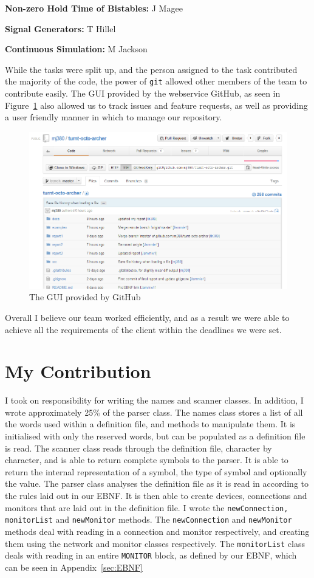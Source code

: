 \documentclass[a4paper,10pt]{article}
\begin{document}
\textbf{Non-zero Hold Time of Bistables:} J Magee

\textbf{Signal Generators:} T Hillel

\textbf{Continuous Simulation:} M Jackson

While the tasks were split up, and the person assigned to the task contributed the majority of the code, the power of \texttt{git} allowed other members of the team to contribute easily. The GUI provided by the webservice GitHub, as seen in Figure~\ref{fig:github} also allowed us to track issues and feature requests, as well as providing a user friendly manner in which to manage our repository.

\begin{figure}[h]
 \centering
 \includegraphics[width=.79\textwidth]{github}
 \caption{The GUI provided by GitHub}
 \label{fig:github}
\end{figure}

Overall I believe our team worked efficiently, and as a result we were able to achieve all the requirements of the client within the deadlines we were set.

\section{My Contribution}

I took on responsibility for writing the names and scanner classes. In addition, I wrote approximately 25\% of the parser class. The names class stores a list of all the words used within a definition file, and methods to manipulate them. It is initialised with only the reserved words, but can be populated as a definition file is read. The scanner class reads through the definition file, character by character, and is able to return complete symbols to the parser. It is able to return the internal representation of a symbol, the type of symbol and optionally the value. The parser class analyses the definition file as it is read in according to the rules laid out in our EBNF. It is then able to create devices, connections and monitors that are laid out in the definition file. I wrote the \texttt{newConnection, monitorList} and \texttt{newMonitor} methods. The \texttt{newConnection} and \texttt{newMonitor} methods deal with reading in a connection and monitor respectively, and creating them using the network and monitor classes respectively. The \texttt{monitorList} class deals with reading in an entire \texttt{MONITOR} block, as defined by our EBNF, which can be seen in Appendix~\ref{sec:EBNF}
\end{document}
